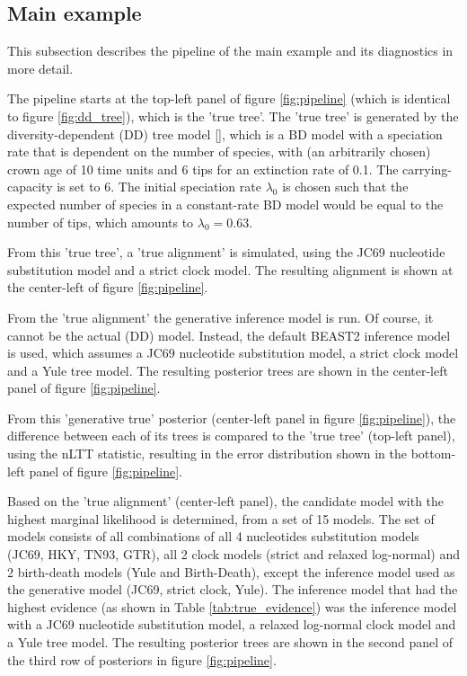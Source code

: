 \newpage

\subsection{Main example}
\label{subsec:main_example}

This subsection describes the pipeline of the main example 
and its diagnostics in more detail. 

The pipeline starts at the top-left panel of figure \ref{fig:pipeline} (which 
is identical to figure \ref{fig:dd_tree}),
which is the 'true tree'.
The 'true tree' is generated by the diversity-dependent (DD) 
tree model [\citep{DDD, etienne2012diversity}],
which is a BD model with a speciation rate that is dependent on the number of species,
with (an arbitrarily chosen) crown age of 10 time units 
and 6 tips for an extinction rate of 0.1. 
The carrying-capacity is set to 6. 
The initial speciation rate $\lambda_0$ is chosen 
such that the expected number of species in a constant-rate BD model 
would be equal to the number of tips, which amounts to $\lambda_0 = 0.63$.

From this 'true tree', a 'true alignment' is simulated, using
the JC69 nucleotide substitution model and a strict clock model.
The resulting alignment is shown at the center-left
of figure \ref{fig:pipeline}.

From the 'true alignment' the generative inference model is run.
Of course, it cannot be the actual (DD) model. Instead, the
default BEAST2 inference model is used, which assumes a JC69 nucleotide
substitution model, a strict clock model and a Yule tree model.
The resulting posterior trees are shown in the
center-left panel of figure \ref{fig:pipeline}.

From this 'generative true' posterior (center-left panel in figure \ref{fig:pipeline}), the difference between each of its trees is
compared to the 'true tree' (top-left panel), using the nLTT statistic,
resulting in the error distribution shown in the bottom-left panel
of figure \ref{fig:pipeline}.

Based on the 'true alignment' (center-left panel), the candidate model
with the highest marginal likelihood is determined, from a set of 
15 models. The set of models consists of all combinations
of all 4 nucleotides substitution models (JC69, HKY, TN93, GTR),
all 2 clock models (strict and relaxed log-normal) and 2 birth-death
models (Yule and Birth-Death), except the inference model used as the
generative model (JC69, strict clock, Yule). The inference model that had the
highest evidence (as shown in Table \ref{tab:true_evidence}) was 
the inference model with a JC69 nucleotide substitution model,
a relaxed log-normal clock model and a Yule tree model.
The resulting posterior trees are shown in the second panel
of the third row of posteriors in figure \ref{fig:pipeline}.

